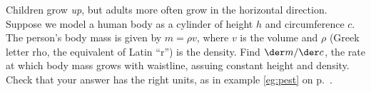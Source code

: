 Children grow \emph{up}, but adults more often grow in the
horizontal direction. Suppose we model a human body as
a cylinder of height $h$ and circumference $c$. The person's
body mass is given by $m=\rho v$, where $v$ is the
volume and $\rho$ (Greek
letter rho, the equivalent of Latin ``r'') is the density.
Find $\der m/\der c$, the rate at which body mass
grows with waistline, assuing constant height and density.
Check that your answer has the right units, as in example
\ref{eg:pest} on p.~\pageref{eg:pest}.\answercheck
